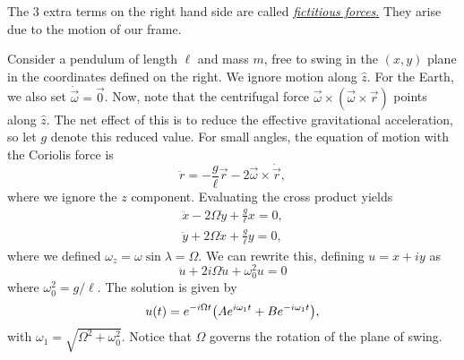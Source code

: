 \documentclass{article}
\begin{document}
The 3 extra terms on the right hand side are called \href{https://en.wikipedia.org/wiki/Fictitious_force}{\textit{fictitious forces}.} They arise due to the motion of our frame.\\
\vspace{-0.5cm}
\begin{wrapfigure}{r}{0cm}
\end{wrapfigure}
\begin{example}
		Consider a pendulum of length $ \ell $ and mass $m$, free to swing in the $(x,y)$ plane in the coordinates defined on the right. We ignore motion along $\hat{z}$. For the Earth, we also set $\dot{\vec{\omega}} = \vec{0}$. Now, note that the centrifugal force $\vec{\omega} \times (\vec{\omega} \times \vec{r})$ points along $ \hat{z} $. The net effect of this is to reduce the effective gravitational acceleration, so let $ g $ denote this reduced value. For small angles, the equation of motion with the Coriolis force is
		\[
			\ddot{r} = -\frac{g}{\ell} \vec{r} - 2 \vec{\omega} \times \dot{\vec{r}},
		\]
		where we ignore the $z$ component. Evaluating the cross product yields
		\begin{gather*}
			\ddot{x} - 2 \Omega \dot{y} + \frac{g}{\ell} x = 0, \\
			\ddot{y} + 2 \Omega \dot{x} + \frac{g}{\ell}y = 0,
		\end{gather*}
		where we defined $ \omega_z = \omega \sin \lambda = \Omega. $ We can rewrite this, defining $ u = x + iy $ as
		\[
		\ddot{u} + 2i \Omega \dot{u} + \omega_0^2 u = 0
		\]
		where $ \omega_0^ 2 = g/\ell $. The solution is given by
		\[
			u(t) = e^{-i\Omega t} \qty(A e^{i\omega_1 t} + B e^{-i \omega_1 t}),
		\]
		with $\omega_1 = \sqrt{\Omega^2 + \omega_0^2}$. Notice that $\Omega$ governs the rotation of the plane of swing.
	\end{example}
\end{document}
